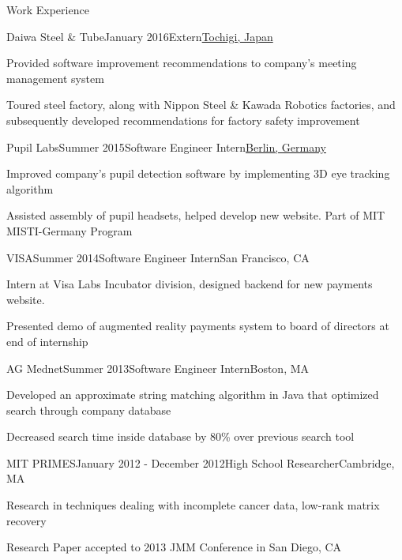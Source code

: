 \documentclass{resume} %
\begin{document}
\begin{rSection}{Work Experience}

\begin{rSubsection}{Daiwa Steel \& Tube}{January 2016}{Extern}{\underline{Tochigi, Japan}}
\item Provided software improvement recommendations to company's meeting management system
\item Toured steel factory, along with Nippon Steel \& Kawada Robotics factories, and subsequently developed recommendations for factory safety improvement
\end{rSubsection}


\begin{rSubsection}{Pupil Labs}{Summer 2015}{Software Engineer Intern}{\underline{Berlin, Germany}}
\item Improved company's pupil detection software by implementing 3D eye tracking algorithm
\item Assisted assembly of pupil headsets, helped develop new website. Part of MIT MISTI-Germany Program
\end{rSubsection}


\begin{rSubsection}{VISA}{Summer 2014}{Software Engineer Intern}{San Francisco, CA}
\item Intern at Visa Labs Incubator division, designed backend for new payments website. 
\item Presented demo of augmented reality payments system to board of directors at end of internship
\end{rSubsection}


\begin{rSubsection}{AG Mednet}{Summer 2013}{Software Engineer Intern}{Boston, MA}
\item Developed an approximate string matching algorithm in Java that optimized search through company database
\item Decreased search time inside database by 80\% over previous search tool
\end{rSubsection}


\begin{rSubsection}{MIT PRIMES}{January 2012 - December 2012}{High School Researcher}{Cambridge, MA}
\item Research in techniques dealing with incomplete cancer data, low-rank matrix recovery
\item Research Paper accepted to 2013 JMM Conference in San Diego, CA
\end{rSubsection}

\end{rSection}
\end{document}
